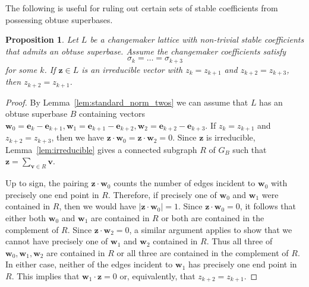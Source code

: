 \documentclass{amsart} %
\newcommand{\e}{\bm{e}}
\newcommand{\bv}{\bm{v}}
\theoremstyle{thm}
\newtheorem{prop}[Theorem]{Proposition}
\theoremstyle{definition}
\numberwithin{equation}{section}
\begin{document}
The following is useful for ruling out certain sets of stable coefficients from possessing obtuse superbases.
\begin{prop}\label{prop:4_string}
Let $L$ be a changemaker lattice with non-trivial stable coefficients that admits an obtuse superbase. Assume the changemaker coefficients satisfy \[\sigma_k = \dots = \sigma_{k+3}\] for some $k$. If $\bm{z}\in L$ is an irreducible vector with $z_k=z_{k+1}$ and $z_{k+2}=z_{k+3}$, then $z_{k+2}=z_{k+1}$.
\end{prop}
\begin{proof}
By Lemma~\ref{lem:standard_norm_twos} we can assume that $L$ has an obtuse superbase $B$ containing vectors $\bm{w}_0=\e_k-\e_{k+1}, \bm{w}_1=\e_{k+1}-\e_{k+2}, \bm{w}_2=\e_{k+2}-\e_{k+3}$. If $z_k=z_{k+1}$ and $z_{k+2}=z_{k+3}$, then we have $\bm{z}\cdot \bm{w}_0=\bm{z}\cdot \bm{w}_2=0$. Since $\bm{z}$ is irreducible, Lemma~\ref{lem:irreducible} gives a connected subgraph $R$ of $G_B$ such that $\bm{z}=\sum_{\bv\in R}\bv$.

Up to sign, the pairing $\bm{z}\cdot \bm{w}_0$ counts the number of edges incident to $\bm{w}_0$ with precisely one end point in $R$. Therefore, if precisely one of $\bm{w}_0$ and $\bm{w}_1$ were contained in $R$, then we would have $|\bm{z}\cdot \bm{w}_0|=1$. Since $\bm{z}\cdot \bm{w}_0=0$, it follows that either both $\bm{w}_0$ and $\bm{w}_1$ are contained in $R$ or both are contained in the complement of $R$. Since $\bm{z}\cdot \bm{w}_2=0$, a similar argument applies to show that we cannot have precisely one of $\bm{w}_1$ and $\bm{w}_2$ contained in $R$.
Thus all three of $\bm{w}_0, \bm{w}_1, \bm{w}_2$ are contained in $R$ or all three are contained in the complement of $R$. In either case, neither of the edges incident to $\bm{w}_1$ has precisely one end point in $R$. This implies that $\bm{w}_1\cdot \bm{z} =0$ or, equivalently, that $z_{k+2}=z_{k+1}$.
\end{proof}
\end{document}

